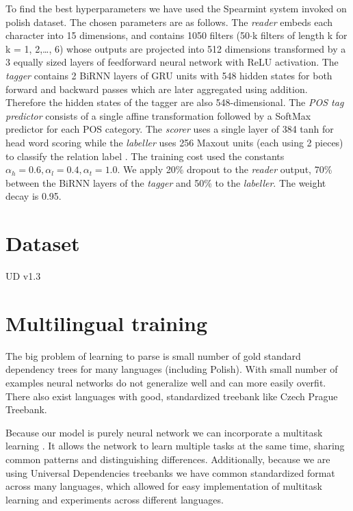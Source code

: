 To find the best hyperparameters we have used the Spearmint system \cite{snoek_practical_2012}
invoked on polish dataset. The chosen parameters are as follows.
The \emph{reader} embeds each character into 15 dimensions, and
contains 1050 filters (50$\cdot$k filters of length k for k = 1, 2,\dots, 6) 
whose outputs are projected into 512 dimensions transformed by a 3 equally
sized layers of feedforward neural network with ReLU activation.
The \emph{tagger} contains 2 BiRNN layers of GRU units with 548 hidden
states for both forward and backward passes which are later aggregated using
addition. Therefore the hidden states of the tagger are also 548-dimensional.
The \emph{POS tag predictor} consists of a single affine transformation
followed by a SoftMax predictor for each POS category.
The \emph{scorer} uses a single layer of 384 tanh for head word
scoring while the \emph{labeller} uses 256 Maxout units
(each using 2 pieces) to classify the relation label
\cite{goodfellow_maxout_2013}. The training cost used the constants
$\alpha_h=0.6, \alpha_l=0.4, \alpha_t=1.0$.
We apply 20\% dropout to the \emph{reader} output, 70\% between the BiRNN
layers of the \emph{tagger} and 50\% to the \emph{labeller}. The weight
decay is 0.95. %

\section{Dataset}
UD v1.3

\section{Multilingual training}
The big problem of learning to parse is small number of gold standard dependency
trees for many languages (including Polish). With small number of examples
neural networks do not generalize well and can more easily overfit.
There also exist languages with good, standardized treebank like Czech Prague
Treebank\cite{prague_treebank}.

Because our model is purely neural network we can incorporate a multitask learning
\cite{caruana_multitask_learning}. It allows the network to learn multiple tasks
at the same time, sharing common patterns and distinguishing differences.
Additionally, because we are using Universal Dependencies treebanks \cite{nivre_universal_2015}
we have common standardized format across many languages, which allowed for
easy implementation of multitask learning and experiments across different languages.


